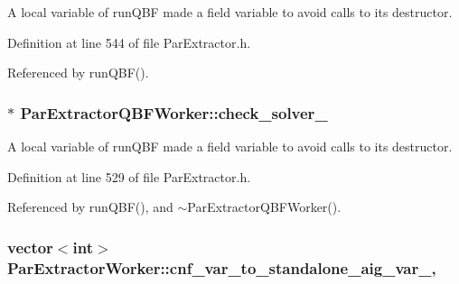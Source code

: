 A local variable of run\-Q\-B\-F made a field variable to avoid calls to its destructor. 



Definition at line 544 of file Par\-Extractor.\-h.



Referenced by run\-Q\-B\-F().

\hypertarget{classParExtractorQBFWorker_a502e2ad2571150e5163521f24ad7ed44}{
\subsubsection[{check\-\_\-solver\-\_\-}]{$\ast$ Par\-Extractor\-Q\-B\-F\-Worker\-::check\-\_\-solver\-\_\-\hspace{0.3cm}{\ttfamily [protected]}}}\label{classParExtractorQBFWorker_a502e2ad2571150e5163521f24ad7ed44}


A local variable of run\-Q\-B\-F made a field variable to avoid calls to its destructor. 



Definition at line 529 of file Par\-Extractor.\-h.



Referenced by run\-Q\-B\-F(), and $\sim$\-Par\-Extractor\-Q\-B\-F\-Worker().

\hypertarget{classParExtractorWorker_a90ef43d28785c5c5607159ddc7b54ce3}{
\subsubsection[{cnf\-\_\-var\-\_\-to\-\_\-standalone\-\_\-aig\-\_\-var\-\_\-}]{\setlength{\rightskip}{0pt plus 5cm}vector$<$int$>$ Par\-Extractor\-Worker\-::cnf\-\_\-var\-\_\-to\-\_\-standalone\-\_\-aig\-\_\-var\-\_\-\hspace{0.3cm}{\ttfamily [protected]}, {\ttfamily [inherited]}}}\label{classParExtractorWorker_a90ef43d28785c5c5607159ddc7b54ce3}


